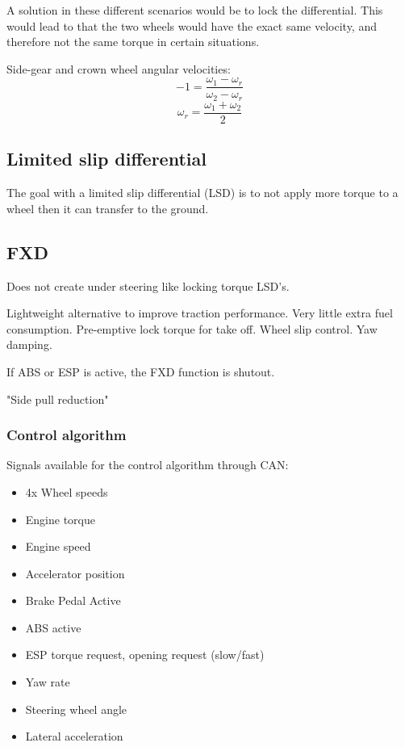 A solution in these different scenarios would be to lock the differential. This would lead to that the two wheels would have the exact same velocity, and therefore not the same torque in certain situations. 

Side-gear and crown wheel angular velocities:
\begin{equation}
	-1 = \frac{\omega_{1} - \omega_{r}}{\omega_{2} - \omega_{r}}
\end{equation}
\begin{equation}
	\omega_{r} = \frac{\omega_{1} + \omega_{2}}{2}
\end{equation}

\subsection{Limited slip differential}

The goal with a limited slip differential (LSD) is to not apply more torque to a wheel then it can transfer to the ground.

\subsection{FXD}

Does not create under steering like locking torque LSD's. 

Lightweight alternative  to improve traction performance. Very little extra fuel consumption. Pre-emptive lock torque for take off. Wheel slip control. Yaw damping. 

If ABS or ESP is active, the FXD function is shutout. 

"Side pull reduction"


\subsubsection{Control algorithm}

Signals available for the control algorithm through CAN:
\begin{itemize}
	\item 4x Wheel speeds
	\item Engine torque
	\item Engine speed
	\item Accelerator position
	\item Brake Pedal Active
	\item ABS active
	\item ESP torque request, opening request (slow/fast)
	\item Yaw rate
	\item Steering wheel angle
	\item Lateral acceleration
\end{itemize}

